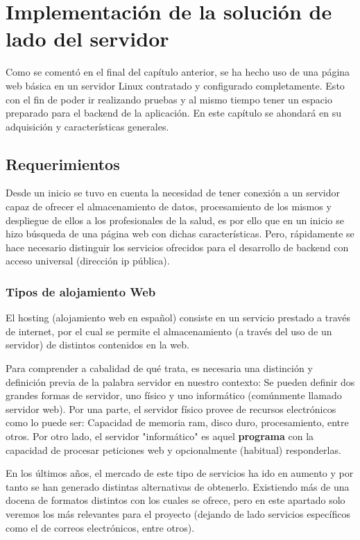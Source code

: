 \chapter{Implementación de la solución de lado del servidor}\label{servidor}
Como se comentó en el final del capítulo anterior, se ha hecho uso de una página web básica en un servidor Linux contratado y configurado completamente. Esto con el fin de poder ir realizando pruebas y al mismo tiempo tener un espacio preparado para el backend de la aplicación. En este capítulo se ahondará en su adquisición y características generales.

\section{Requerimientos}
Desde un inicio se tuvo en cuenta la necesidad de tener conexión a un servidor capaz de ofrecer el almacenamiento de datos, procesamiento de los mismos y despliegue de ellos a los profesionales de la salud, es por ello que en un inicio se hizo búsqueda de una página web con dichas características. Pero, rápidamente se hace necesario distinguir los servicios ofrecidos para el desarrollo de backend con acceso universal (dirección ip pública).

\subsection{Tipos de alojamiento Web}
El hosting\cite{hosting_web} (alojamiento web en español) consiste en un servicio prestado a través de internet, por el cual se permite el almacenamiento (a través del uso de un servidor) de distintos contenidos en la web.

\newpage
Para comprender a cabalidad de qué trata, es necesaria una distinción y definición previa de la palabra servidor en nuestro contexto: Se pueden definir dos grandes formas de servidor, uno físico y uno informático (comúnmente llamado servidor web).
Por una parte, el servidor físico provee de recursos electrónicos como lo puede ser: Capacidad de memoria ram, disco duro, procesamiento, entre otros. Por otro lado, el servidor "informático" es aquel \textbf{programa} con la capacidad de procesar peticiones web y opcionalmente (habitual) responderlas.

En los últimos años, el mercado de este tipo de servicios ha ido en aumento y por tanto se han generado distintas alternativas de obtenerlo. Existiendo más de una docena de formatos distintos con los cuales se ofrece, pero en este apartado solo veremos los más relevantes para el proyecto (dejando de lado servicios específicos como el de correos electrónicos, entre otros).

